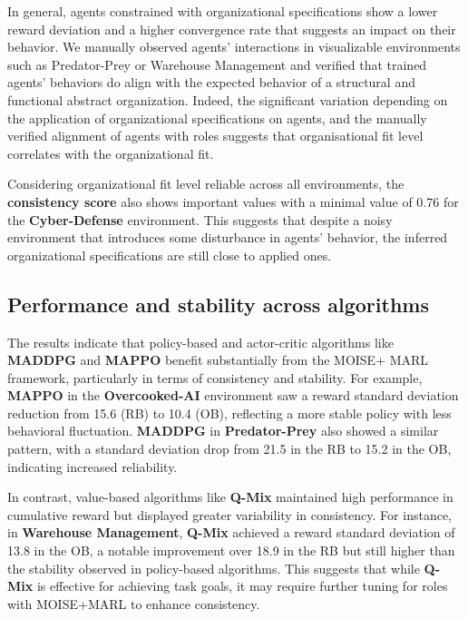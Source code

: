 \documentclass[conference]{IEEEtran}
\begin{document}
In general, agents constrained with organizational specifications show a lower reward deviation and a higher convergence rate that suggests an impact on their behavior. We manually observed agents' interactions in visualizable environments such as Predator-Prey or Warehouse Management and verified that trained agents' behaviors do align with the expected behavior of a structural and functional abstract organization.
%
Indeed, the significant variation depending on the application of organizational specifications on agents, and the manually verified alignment of agents with roles suggests that organisational fit level correlates with the organizational fit.

Considering organizational fit level reliable across all environments, the \textbf{consistency score} also shows important values with a minimal value of 0.76 for the \textbf{Cyber-Defense} environment. This suggests that despite a noisy environment that introduces some disturbance in agents' behavior, the inferred organizational specifications are still close to applied ones.

\subsection{Performance and stability across algorithms}

The results indicate that policy-based and actor-critic algorithms like \textbf{MADDPG} and \textbf{MAPPO} benefit substantially from the MOISE+ MARL framework, particularly in terms of consistency and stability. For example, \textbf{MAPPO} in the \textbf{Overcooked-AI} environment saw a reward standard deviation reduction from 15.6 (RB) to 10.4 (OB), reflecting a more stable policy with less behavioral fluctuation. \textbf{MADDPG} in \textbf{Predator-Prey} also showed a similar pattern, with a standard deviation drop from 21.5 in the RB to 15.2 in the OB, indicating increased reliability.

In contrast, value-based algorithms like \textbf{Q-Mix} maintained high performance in cumulative reward but displayed greater variability in consistency. For instance, in \textbf{Warehouse Management}, \textbf{Q-Mix} achieved a reward standard deviation of 13.8 in the OB, a notable improvement over 18.9 in the RB but still higher than the stability observed in policy-based algorithms. This suggests that while \textbf{Q-Mix} is effective for achieving task goals, it may require further tuning for roles with MOISE+MARL to enhance consistency.
\end{document}
